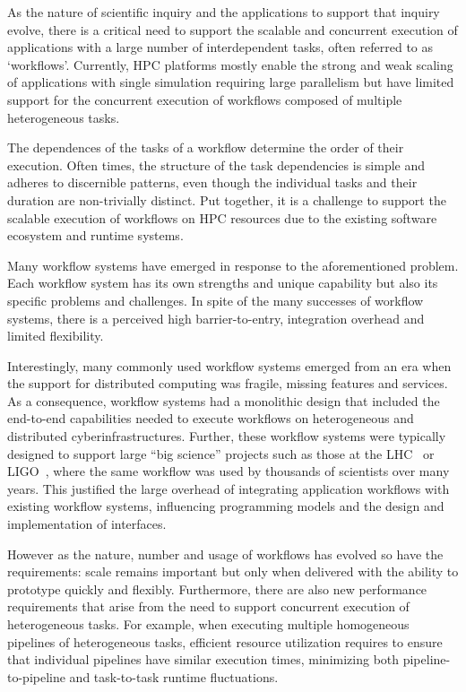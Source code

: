 \documentclass[conference]{IEEEtran}
\begin{document}
As the nature of scientific inquiry and the applications to support that
inquiry evolve, there is a critical need to support the scalable and
concurrent execution of applications with a large number of interdependent
tasks, often referred to as `workflows'. Currently, HPC platforms mostly
enable the strong and weak scaling of applications with single simulation
requiring large parallelism but have limited support for the concurrent
execution of workflows composed of multiple heterogeneous tasks.

The dependences of the tasks of a workflow determine the order of their
execution. Often times, the structure of the task dependencies is simple and
adheres to discernible patterns, even though the individual tasks and their
duration are non-trivially distinct. Put together, it is a challenge to
support the scalable execution of workflows on HPC resources due to the
existing software ecosystem and runtime systems.

Many workflow systems have emerged in response to the aforementioned problem.
Each workflow system has its own strengths and unique capability but also its
specific problems and challenges. In spite of the many successes of workflow
systems, there is a perceived high barrier-to-entry, integration overhead and
limited flexibility.

Interestingly, many commonly used workflow systems emerged from an era when
the support for distributed computing was fragile, missing features and
services. As a consequence, workflow systems had a monolithic design that
included the end-to-end capabilities needed to execute workflows on
heterogeneous and distributed cyberinfrastructures. Further, these workflow
systems were typically designed to support large ``big science'' projects
such as those at the LHC~\cite{breskin2009cern} or
LIGO~\cite{althouse1992ligo}, where the same workflow was used by thousands
of scientists over many years. This justified the large overhead of
integrating application workflows with existing workflow systems, influencing
programming models and the design and implementation of interfaces.

However as the nature, number and usage of workflows has evolved so have the
requirements: scale remains important but only when delivered with the
ability to prototype quickly and flexibly. Furthermore, there are also new
performance requirements that arise from the need to support concurrent
execution of heterogeneous tasks. For example, when executing multiple
homogeneous pipelines of heterogeneous tasks, efficient resource utilization
requires to ensure that individual pipelines have similar execution times,
minimizing both pipeline-to-pipeline and task-to-task runtime fluctuations.
\end{document}

